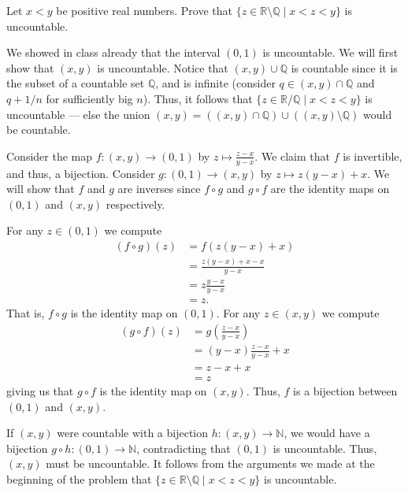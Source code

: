 \documentclass[12 pt, letterpaper]{hmcpset}
\begin{document}
\pagebreak

\begin{problem}[6.]
	Let $x < y$ be positive real numbers. Prove that $\{ z \in \mathbb{R} \setminus \mathbb{Q} \mid x < z < y \}$ is uncountable.
\end{problem}

\begin{solution}
	We showed in class already that the interval $(0, 1)$ is uncountable. We will first show that $(x, y)$ is uncountable. Notice that $(x, y) \cup \mathbb{Q}$ is countable since it is the subset of a countable set $\mathbb{Q}$, and is infinite (consider $q \in (x, y) \cap \mathbb{Q}$ and $q + 1/n$ for sufficiently big $n$). Thus, it follows that $\{ z \in \mathbb{R} / \mathbb{Q} \mid x < z < y \}$ is uncountable --- else the union $(x, y) = ((x, y) \cap \mathbb{Q}) \cup ((x, y) \setminus \mathbb{Q})$ would be countable.

	Consider the map $f : (x, y) \to (0, 1)$ by $z \mapsto \frac{z - x}{y - x}$. We claim that $f$ is invertible, and thus, a bijection. Consider $g : (0, 1) \to (x, y)$ by $z \mapsto z(y - x) + x$. We will show that $f$ and $g$ are inverses since $f \circ g$ and $g \circ f$ are the identity maps on  $(0, 1)$ and $(x, y)$ respectively.

	For any $z \in (0, 1)$ we compute
	\[
		\begin{split}
			(f \circ g)(z) & = f \left ( z(y - x) + x \right ) \\
				       & = \frac{z(y - x) + x - x}{y - x} \\
				       & = z \frac{y - x}{y - x} \\
				       & = z.
		\end{split}
	\]
	That is, $f \circ g$ is the identity map on $(0, 1)$. For any $z \in (x, y)$ we compute
	\[
		\begin{split}
			(g \circ f)(z) & = g \left ( \frac{z - x}{y - x} \right ) \\
				       & = (y - x) \frac{z - x}{y - x} + x \\
				       & = z - x + x \\
				       & = z
		\end{split}
	\]
	giving us that $g \circ f$ is the identity map on $(x, y)$. Thus, $f$ is a bijection between $(0, 1)$ and $(x, y)$.

	 If $(x, y)$ were countable with a bijection $h : (x, y) \to \mathbb{N}$, we would have a bijection $g \circ h : (0, 1) \to \mathbb{N}$, contradicting that $(0, 1)$ is uncountable. Thus, $(x, y)$ must be uncountable. It follows from the arguments we made at the beginning of the problem that $\{ z \in \mathbb{R} \setminus \mathbb{Q} \mid x < z < y \}$ is uncountable.
\end{solution}
\end{document}
